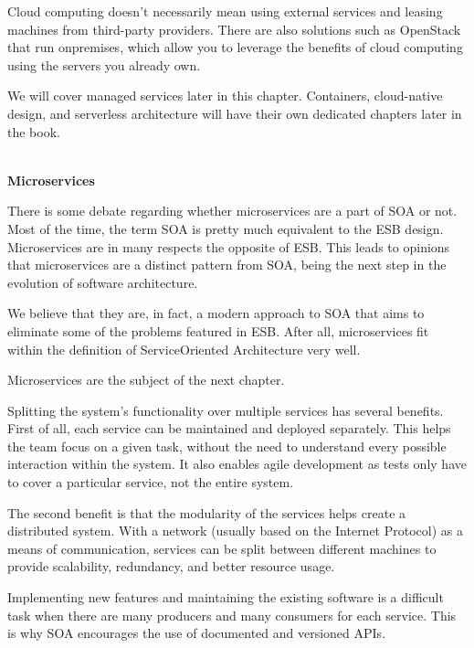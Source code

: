 Cloud computing doesn't necessarily mean using external services and leasing machines from third-party providers. There are also solutions such as OpenStack that run onpremises, which allow you to leverage the benefits of cloud computing using the servers you already own.

We will cover managed services later in this chapter. Containers, cloud-native design, and serverless architecture will have their own dedicated chapters later in the book.

\hspace*{\fill} \\ %
\noindent
\textbf{Microservices}

There is some debate regarding whether microservices are a part of SOA or not. Most of the time, the term SOA is pretty much equivalent to the ESB design. Microservices are in many respects the opposite of ESB. This leads to opinions that microservices are a distinct pattern from SOA, being the next step in the evolution of software architecture.

We believe that they are, in fact, a modern approach to SOA that aims to eliminate some of the problems featured in ESB. After all, microservices fit within the definition of ServiceOriented Architecture very well.

Microservices are the subject of the next chapter.


Splitting the system's functionality over multiple services has several benefits. First of all, each service can be maintained and deployed separately. This helps the team focus on a given task, without the need to understand every possible interaction within the system. It also enables agile development as tests only have to cover a particular service, not the entire system.

The second benefit is that the modularity of the services helps create a distributed system. With a network (usually based on the Internet Protocol) as a means of communication, services can be split between different machines to provide scalability, redundancy, and better resource usage.

Implementing new features and maintaining the existing software is a difficult task when there are many producers and many consumers for each service. This is why SOA encourages the use of documented and versioned APIs.

